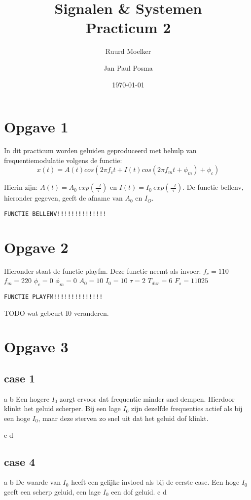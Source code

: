 \documentclass{article}
\author{Ruurd Moelker \and Jan Paul Posma}
\date{\today}
\title{Signalen \& Systemen \\Practicum 2}
\begin{document}
\maketitle
 
\section{Opgave 1}
In dit practicum worden geluiden geproduceerd met behulp van frequentiemodulatie volgens de functie:
$$x(t) = A(t)cos(2 \pi f_c t + I(t)cos(2 \pi f_m t + \phi_m) + \phi_c)$$

Hierin zijn: $A(t) = A_0~exp(\frac{-t}{\tau})$ en $I(t) = I_0~exp(\frac{-t}{\tau})$. De functie bellenv, hieronder gegeven, geeft de afname van $A_0$ en $I_O$.

\begin{lstlisting}
FUNCTIE BELLENV!!!!!!!!!!!!!!
\end{lstlisting}

\section{Opgave 2}

Hieronder staat de functie playfm. Deze functie neemt als invoer:
$f_c = 110$ 
$f_m = 220$ 
$\phi_c = 0$ 
$\phi_m = 0$ 
$A_0 = 10$ 
$I_0 = 10$ 
$\tau = 2$ 
$T_{dur} = 6$
$F_s = 11025$

\begin{lstlisting}
FUNCTIE PLAYFM!!!!!!!!!!!!!!
\end{lstlisting}

TODO wat gebeurt I0 veranderen. 


\section{Opgave 3}
\subsection{case 1}
a
b
Een hogere $I_0$ zorgt ervoor dat frequentie minder snel dempen. Hierdoor klinkt het geluid scherper. Bij een lage $I_0$ zijn dezelfde frequenties actief als bij een hoge $I_0$, maar deze sterven zo snel uit dat het geluid dof klinkt.

c
d
\subsection{case 4}
a
b
De waarde van $I_0$ heeft een gelijke invloed als bij de eerste case. Een hoge $I_0$ geeft een scherp geluid, een lage $I_0$ een dof geluid.
c
d
\end{document}
